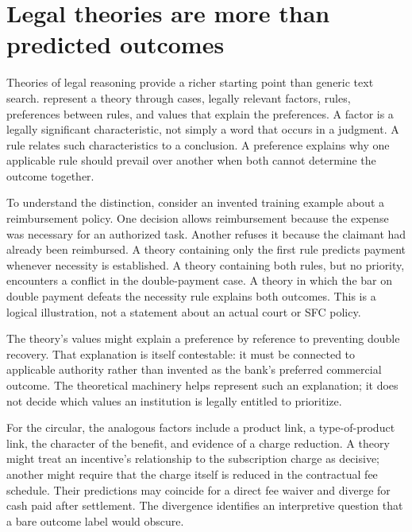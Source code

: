\section{Legal theories are more than predicted outcomes}
\label{merge:M05:01}


Theories of legal reasoning provide a richer starting point than generic text
search. \citet[sections 3--5]{theories2003} represent a theory through cases,
legally relevant factors, rules, preferences between rules, and values that
explain the preferences. A factor is a legally significant characteristic, not
simply a word that occurs in a judgment. A rule relates such characteristics to a
conclusion. A preference explains why one applicable rule should prevail over
another when both cannot determine the outcome together.

To understand the distinction, consider an invented training example about a
reimbursement policy. One decision allows reimbursement because the expense was
necessary for an authorized task. Another refuses it because the claimant had
already been reimbursed. A theory containing only the first rule predicts payment
whenever necessity is established. A theory containing both rules, but no
priority, encounters a conflict in the double-payment case. A theory in which the
bar on double payment defeats the necessity rule explains both outcomes. This is
a logical illustration, not a statement about an actual court or SFC policy.


The theory's values might explain a preference by reference to preventing double
recovery. That explanation is itself contestable: it must be connected to
applicable authority rather than invented as the bank's preferred commercial
outcome. The theoretical machinery helps represent such an explanation; it does
not decide which values an institution is legally entitled to prioritize.

For the circular, the analogous factors include a product link, a type-of-product
link, the character of the benefit, and evidence of a charge reduction. A theory
might treat an incentive's relationship to the subscription charge as decisive;
another might require that the charge itself is reduced in the contractual fee
schedule. Their predictions may coincide for a direct fee waiver and diverge for
cash paid after settlement. The divergence identifies an interpretive question
that a bare outcome label would obscure.

